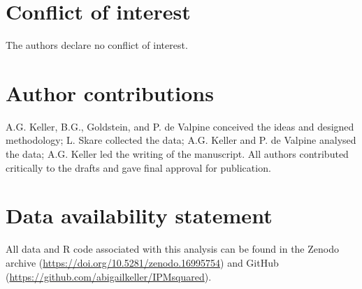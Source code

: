 \documentclass{article}
\begin{document}
\section{Conflict of interest}

The authors declare no conflict of interest.

\section{Author contributions}

A.G. Keller, B.G., Goldstein, and P. de Valpine conceived the ideas and designed methodology; L. Skare collected the data; A.G. Keller and P. de Valpine analysed the data; A.G. Keller led the writing of the manuscript. All authors contributed critically to the drafts and gave final approval for publication.

\section{Data availability statement}

All data and R code associated with this analysis can be found in the Zenodo archive (\url{https://doi.org/10.5281/zenodo.16995754})
and GitHub (\url{https://github.com/abigailkeller/IPMsquared}). 
\end{document}

